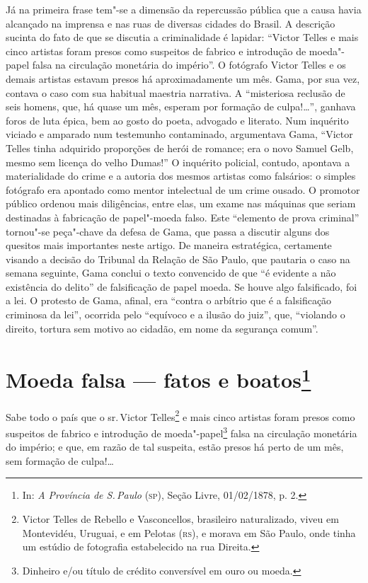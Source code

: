 \paginabranca
\mbox{}\vfill
\thispagestyle{empty}

{\small\noindent
Já na primeira frase tem"-se a dimensão da repercussão pública que a causa
havia alcançado na imprensa e nas ruas de diversas cidades do Brasil. A
descrição sucinta do fato de que se discutia a criminalidade é lapidar:
``Victor Telles e mais cinco artistas foram presos como suspeitos de
fabrico e introdução de moeda"-papel falsa na circulação monetária do
império''. O fotógrafo Victor Telles e os demais artistas estavam presos
há aproximadamente um mês. Gama, por sua vez, contava o caso com sua
habitual maestria narrativa. A ``misteriosa reclusão de seis homens, que,
há quase um mês, esperam por formação de culpa!\ldots{}'', ganhava foros de
luta épica, bem ao gosto do poeta, advogado e literato. Num inquérito
viciado e amparado num testemunho contaminado, argumentava Gama, ``Victor
Telles tinha adquirido proporções de herói de romance; era o novo Samuel
Gelb, mesmo sem licença do velho Dumas!'' O inquérito policial, contudo,
apontava a materialidade do crime e a autoria dos mesmos artistas como
falsários: o simples fotógrafo era apontado como mentor intelectual de
um crime ousado. O promotor público ordenou mais diligências, entre
elas, um exame nas máquinas que seriam destinadas à fabricação de
papel"-moeda falso. Este ``elemento de prova criminal''
tornou"-se peça"-chave da defesa de Gama, que passa a discutir alguns dos quesitos
mais importantes neste artigo. De maneira estratégica, certamente
visando a decisão do Tribunal da Relação de São Paulo, que pautaria o
caso na semana seguinte, Gama conclui o texto convencido
de que ``é evidente a não existência do delito'' de falsificação de
papel moeda. Se houve algo falsificado, foi a lei. O protesto de Gama,
afinal, era ``contra o arbítrio que é a falsificação criminosa da lei'',
ocorrida pelo ``equívoco e a ilusão do juiz'', que, ``violando
o direito, tortura sem motivo ao cidadão, em nome da segurança comum''. }

\chapter{Moeda falsa --- fatos e boatos\footnote[*]{In: \emph{A
  Província de S.\,Paulo} (\textsc{sp}), Seção Livre, 01/02/1878, p. 2.}}


Sabe todo o país que o sr.\,Victor Telles\footnote{Victor Telles de
  Rebello e Vasconcellos, brasileiro naturalizado, viveu em Montevidéu,
  Uruguai, e em Pelotas (\textsc{rs}), e morava em São Paulo, onde tinha um estúdio de
  fotografia estabelecido na rua Direita.} e mais cinco artistas foram
presos como suspeitos de fabrico e introdução de moeda"-papel\footnote{
  Dinheiro e/ou título de crédito conversível em ouro ou moeda.} falsa
na circulação monetária do império; e que, em razão de tal suspeita,
estão presos há perto de um mês, sem formação de culpa!\ldots{}

